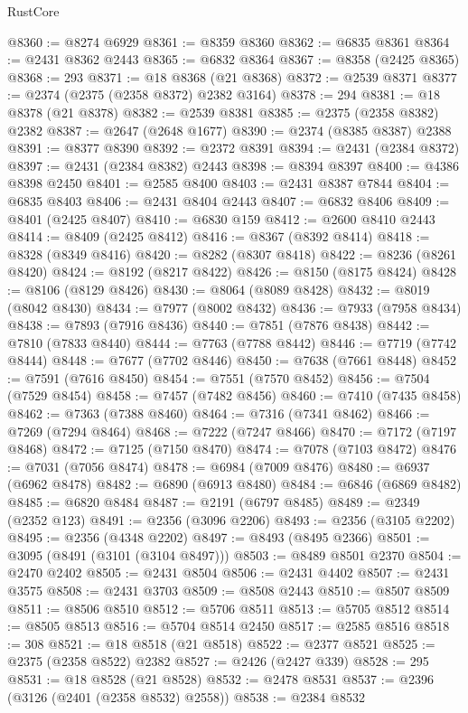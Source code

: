 \begin{lexlean}{RustCore}
\begin{coremodule}
@8360 := @8274 @6929
@8361 := @8359 @8360
@8362 := @6835 @8361
@8364 := @2431 @8362 @2443
@8365 := @6832 @8364
@8367 := @8358 (@2425 @8365)
@8368 := 293
@8371 := @18 @8368 (@21 @8368)
@8372 := @2539 @8371
@8377 := @2374 (@2375 (@2358 @8372) @2382 @3164)
@8378 := 294
@8381 := @18 @8378 (@21 @8378)
@8382 := @2539 @8381
@8385 := @2375 (@2358 @8382) @2382
@8387 := @2647 (@2648 @1677)
@8390 := @2374 (@8385 @8387) @2388
@8391 := @8377 @8390
@8392 := @2372 @8391
@8394 := @2431 (@2384 @8372)
@8397 := @2431 (@2384 @8382) @2443
@8398 := @8394 @8397
@8400 := @4386 @8398 @2450
@8401 := @2585 @8400
@8403 := @2431 @8387 @7844
@8404 := @6835 @8403
@8406 := @2431 @8404 @2443
@8407 := @6832 @8406
@8409 := @8401 (@2425 @8407)
@8410 := @6830 @159
@8412 := @2600 @8410 @2443
@8414 := @8409 (@2425 @8412)
@8416 := @8367 (@8392 @8414)
@8418 := @8328 (@8349 @8416)
@8420 := @8282 (@8307 @8418)
@8422 := @8236 (@8261 @8420)
@8424 := @8192 (@8217 @8422)
@8426 := @8150 (@8175 @8424)
@8428 := @8106 (@8129 @8426)
@8430 := @8064 (@8089 @8428)
@8432 := @8019 (@8042 @8430)
@8434 := @7977 (@8002 @8432)
@8436 := @7933 (@7958 @8434)
@8438 := @7893 (@7916 @8436)
@8440 := @7851 (@7876 @8438)
@8442 := @7810 (@7833 @8440)
@8444 := @7763 (@7788 @8442)
@8446 := @7719 (@7742 @8444)
@8448 := @7677 (@7702 @8446)
@8450 := @7638 (@7661 @8448)
@8452 := @7591 (@7616 @8450)
@8454 := @7551 (@7570 @8452)
@8456 := @7504 (@7529 @8454)
@8458 := @7457 (@7482 @8456)
@8460 := @7410 (@7435 @8458)
@8462 := @7363 (@7388 @8460)
@8464 := @7316 (@7341 @8462)
@8466 := @7269 (@7294 @8464)
@8468 := @7222 (@7247 @8466)
@8470 := @7172 (@7197 @8468)
@8472 := @7125 (@7150 @8470)
@8474 := @7078 (@7103 @8472)
@8476 := @7031 (@7056 @8474)
@8478 := @6984 (@7009 @8476)
@8480 := @6937 (@6962 @8478)
@8482 := @6890 (@6913 @8480)
@8484 := @6846 (@6869 @8482)
@8485 := @6820 @8484
@8487 := @2191 (@6797 @8485)
@8489 := @2349 (@2352 @123)
@8491 := @2356 (@3096 @2206)
@8493 := @2356 (@3105 @2202)
@8495 := @2356 (@4348 @2202)
@8497 := @8493 (@8495 @2366)
@8501 := @3095 (@8491 (@3101 (@3104 @8497)))
@8503 := @8489 @8501 @2370
@8504 := @2470 @2402
@8505 := @2431 @8504
@8506 := @2431 @4402
@8507 := @2431 @3575
@8508 := @2431 @3703
@8509 := @8508 @2443
@8510 := @8507 @8509
@8511 := @8506 @8510
@8512 := @5706 @8511
@8513 := @5705 @8512
@8514 := @8505 @8513
@8516 := @5704 @8514 @2450
@8517 := @2585 @8516
@8518 := 308
@8521 := @18 @8518 (@21 @8518)
@8522 := @2377 @8521
@8525 := @2375 (@2358 @8522) @2382
@8527 := @2426 (@2427 @339)
@8528 := 295
@8531 := @18 @8528 (@21 @8528)
@8532 := @2478 @8531
@8537 := @2396 (@3126 (@2401 (@2358 @8532) @2558))
@8538 := @2384 @8532

\end{coremodule}
\end{lexlean}
